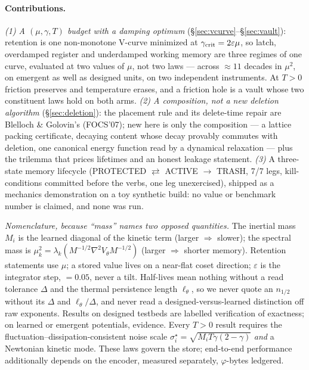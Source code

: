 \paragraph{Contributions.} \emph{(1) A $(\mu,\gamma,T)$ budget with a damping optimum} (\S\ref{sec:vcurve}--\S\ref{sec:vault}): retention is one non-monotone V-curve minimized at $\gamma_{\rm crit}=2\varepsilon\mu$, so latch, overdamped register and underdamped working memory are three regimes of one curve, evaluated at two values of $\mu$, not two laws --- across $\approx11$ decades in $\mu^2$, on emergent as well as designed units, on two independent instruments. At $T>0$ friction preserves and temperature erases, and a friction hole is a vault whose two constituent laws hold on both arms. \emph{(2) A composition, not a new deletion algorithm} (\S\ref{sec:deletion}): the placement rule and its delete-time repair are Blelloch \& Golovin's (FOCS'07); new here is only the composition --- a lattice packing certificate, decaying content whose decay provably commutes with deletion, one canonical energy function read by a dynamical relaxation --- plus the trilemma that prices lifetimes and an honest leakage statement. \emph{(3)} A three-state memory lifecycle (PROTECTED $\rightleftarrows$ ACTIVE $\to$ TRASH, 7/7 legs, kill-conditions committed before the verbs, one leg unexercised), shipped as a mechanics demonstration on a toy synthetic build: no value or benchmark number is claimed, and none was run.

{\footnotesize\emph{Nomenclature, because ``mass'' names two opposed quantities.} The inertial mass $M_i$ is the learned diagonal of the kinetic term (larger $\Rightarrow$ slower); the spectral mass is $\mu_k^2=\lambda_k(M^{-1/2}\nabla^2V_\theta M^{-1/2})$ (larger $\Rightarrow$ shorter memory). Retention statements use $\mu$; a stored value lives on a near-flat coset direction; $\varepsilon$ is the integrator step, $=0.05$, never a tilt. Half-lives mean nothing without a read tolerance $\Delta$ and the thermal persistence length $\ell_\theta$, so we never quote an $n_{1/2}$ without its $\Delta$ and $\ell_\theta/\Delta$, and never read a designed-versus-learned distinction off raw exponents. Results on designed testbeds are labelled verification of exactness; on learned or emergent potentials, evidence. Every $T>0$ result requires the fluctuation--dissipation-consistent noise scale $\sigma^\star_i=\sqrt{M_iT\gamma(2-\gamma)}$ \emph{and} a Newtonian kinetic mode. These laws govern the store; end-to-end performance additionally depends on the encoder, measured separately, $\varphi$-bytes ledgered.\par}

